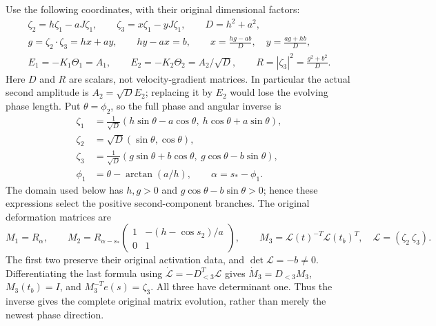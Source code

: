 Use the following coordinates, with their original dimensional factors:
\begin{equation}\label{cvlane:tt:coordinates}
\begin{gathered}
 \zeta_2=h\zeta_1-aJ\zeta_1,\qquad
 \zeta_3=x\zeta_1-yJ\zeta_1,\qquad D=h^2+a^2,\\
 g=\zeta_2\cdot\zeta_3=hx+ay,\qquad
 hy-ax=b,\qquad
 x=\frac{hg-ab}{D},\quad y=\frac{ag+hb}{D},\\
 E_1=-K_1\Theta_1=A_1,\qquad
 E_2=-K_2\Theta_2=A_2/\sqrt D,\qquad
 R=|\zeta_3|^2=\frac{g^2+b^2}{D}.
\end{gathered}
\end{equation}
Here $D$ and $R$ are scalars, not velocity-gradient matrices.
In particular the actual second amplitude is $A_2=\sqrt D E_2$;
replacing it by $E_2$ would lose the evolving phase length.
Put $\theta=\phi_2$, so the full phase and angular inverse is
\begin{align}\label{cvlane:tt:inverse}
 \zeta_1&=\frac1{\sqrt D}
    (h\sin\theta-a\cos\theta,\ h\cos\theta+a\sin\theta),\\
 \zeta_2&=\sqrt D(\sin\theta,\cos\theta),\nonumber\\
 \zeta_3&=\frac1{\sqrt D}
    (g\sin\theta+b\cos\theta,\ g\cos\theta-b\sin\theta),\nonumber\\
 \phi_1&=\theta-\arctan(a/h),\qquad
 \alpha=s_*-\phi_1.\nonumber
\end{align}
The domain used below has $h,g>0$ and
$g\cos\theta-b\sin\theta>0$; hence these expressions select the
positive second-component branches. The original deformation matrices are
\begin{equation}\label{cvlane:tt:matrices}
 M_1=R_\alpha,\qquad
 M_2=R_{\alpha-s_*}
 \begin{pmatrix}1&-(h-\cos s_2)/a\\0&1\end{pmatrix},\qquad
 M_3=\mathcal L(t)^{-T}\mathcal L(t_b)^T,
 \quad\mathcal L=(\zeta_2\ \zeta_3).
\end{equation}
The first two preserve their original activation data, and
$\det\mathcal L=-b\ne0$. Differentiating the last formula using
$\dot{\mathcal L}=-D_{<3}^T\mathcal L$ gives
$\dot M_3=D_{<3}M_3$, $M_3(t_b)=I$, and
$M_3^{-T}e(s)=\zeta_3$. All three have determinant one.
Thus the inverse gives the complete original matrix evolution, rather
than merely the newest phase direction.

